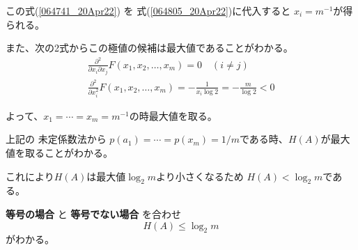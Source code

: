 \documentclass[12pt,b5paper]{ltjsarticle}
\begin{document}
この式(\ref{064741_20Apr22})
を
式(\ref{064805_20Apr22})に代入すると
$x_i=m^{-1}$が得られる。

また、次の2式からこの極値の候補は最大値であることがわかる。
\begin{gather}
 \frac{\partial^2}{\partial x_i\partial x_j} F(x_1,x_2,\dots,x_m) = 0 \quad (i\ne j) \\
 \frac{\partial^2}{\partial x_i^2} F(x_1,x_2,\dots,x_m)
 = -\frac{1}{x_i\log{2}} 
 = -\frac{m}{\log{2}} <0
\end{gather}

よって、$x_1=\cdots=x_m=m^{-1}$の時最大値を取る。

\dotfill

上記の 未定係数法から
$p(a_1)=\cdots=p(x_m)=1/m$である時、$H(A)$が最大値を取ることがわかる。

これにより$H(A)$は最大値$\log_{2}{m}$より小さくなるため
$H(A)<\log_{2}{m}$である。


\textbf{等号の場合}
と
\textbf{等号でない場合}
を合わせ
\begin{equation}
 H(A) \leq \log_{2}{m}
\end{equation}
がわかる。
\end{document}

